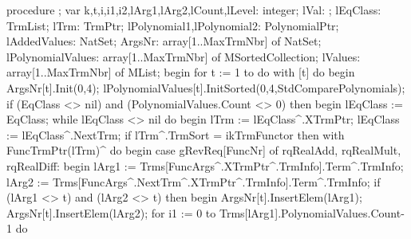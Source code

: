 \eatline
{}\nwendcode{}\nwdocspar
\nwenddocs{}\endmoddef\nwstartdeflinemarkup{}\nwenddeflinemarkup
procedure ;
var
   k,t,i,i1,i2,lArg1,lArg2,lCount,lLevel: integer;
   lVal: ;
   lEqClass: TrmList;
   lTrm: TrmPtr;
   lPolynomial1,lPolynomial2: PolynomialPtr;
   lAddedValues: NatSet;
   ArgsNr: array[1..MaxTrmNbr] of NatSet;
   lPolynomialValues: array[1..MaxTrmNbr] of MSortedCollection;
   lValues: array[1..MaxTrmNbr] of MList;
begin
   for t := 1 to  do
      with [t] do
   begin
      ArgsNr[t].Init(0,4);
      lPolynomialValues[t].InitSorted(0,4,StdComparePolynomials);
      if (EqClass <> nil) and (PolynomialValues.Count <> 0) then
      begin
         lEqClass := EqClass;
         while lEqClass <> nil do
         begin
            lTrm := lEqClass^.XTrmPtr;
            lEqClass := lEqClass^.NextTrm;
            if lTrm^.TrmSort = ikTrmFunctor then
               with FuncTrmPtr(lTrm)^ do
            begin
               case gRevReq[FuncNr] of
                  rqRealAdd, rqRealMult, rqRealDiff:
                     begin
                        lArg1 := Trms[FuncArgs^.XTrmPtr^.TrmInfo].Term^.TrmInfo;
                        lArg2 := Trms[FuncArgs^.NextTrm^.XTrmPtr^.TrmInfo].Term^.TrmInfo;
                        if (lArg1 <> t) and (lArg2 <> t) then
                        begin
                           ArgsNr[t].InsertElem(lArg1);
                           ArgsNr[t].InsertElem(lArg2);
                           for i1 := 0 to Trms[lArg1].PolynomialValues.Count-1 do
